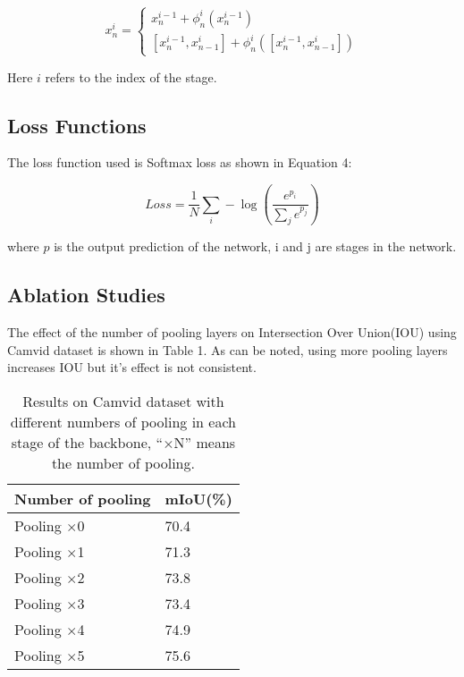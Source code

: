 \documentclass{article}
\begin{document}
\begin{equation}
x_{n}^{i}=\left\{\begin{array}{ll}
x_{n}^{i-1}+\phi_{n}^{i}\left(x_{n}^{i-1}\right) \\
{\left[x_{n}^{i-1}, x_{n-1}^{i}\right]+\phi_{n}^{i}\left(\left[x_{n}^{i-1}, x_{n-1}^{i}\right]\right)}
\end{array}\right.    
\end{equation}

Here $i$ refers to the index of the stage. 

\subsection{Loss Functions}

The loss function used is Softmax loss as shown in Equation 4:

\begin{equation}
Loss =\frac{1}{N} \sum_{i}-\log \left(\frac{e^{p_{i}}}{\sum_{j} e^{p_{j}}}\right)
\end{equation}

where $p$ is the output prediction of the network, i and j are stages in the network.

\subsection{Ablation Studies}

The effect of the number of pooling layers on Intersection Over Union(IOU) using Camvid dataset is shown in Table 1. As can be noted, using more pooling layers increases IOU but it's effect is not consistent.

\begin{table}[h]
  \caption{Results on Camvid dataset with different numbers of pooling in each stage of the backbone, “$\times$N” means the number of pooling.}
  \label{sample-table2}
  \centering
  \begin{tabular}{ll}
  \toprule
    Number of pooling &mIoU(\%)\\
   \midrule
 Pooling $\times$0 &70.4\\
Pooling $\times$1 &71.3\\
Pooling $\times$2 &73.8\\
Pooling $\times$3 &73.4\\
Pooling $\times$4 &74.9\\
Pooling $\times$5 &75.6\\
    \bottomrule
  \end{tabular}
\end{table}
\end{document}
